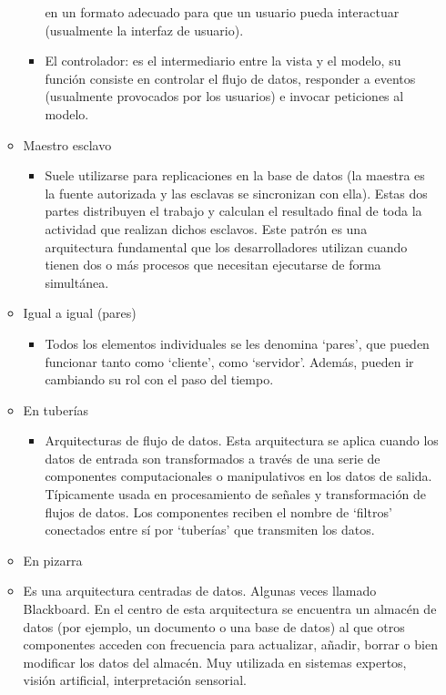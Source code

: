 \documentclass[12pt, twoside, openright]{report} %
\begin{document}
\begin{itemize}
\begin{itemize}
\begin{itemize}
						en un formato adecuado para que un usuario pueda interactuar
						(usualmente la interfaz de usuario).
						\item
						El controlador: es el intermediario entre la vista y el modelo,
						su función consiste en controlar el flujo de datos, responder a
						eventos (usualmente provocados por los usuarios) e invocar
						peticiones al modelo.
					\end{itemize}
			\item Maestro esclavo
				\begin{itemize}
					\item Suele utilizarse para replicaciones en la base de datos (la
					maestra es la fuente autorizada y las esclavas se sincronizan
					con ella). Estas dos partes distribuyen el trabajo y calculan el
					resultado final de toda la actividad que realizan dichos
					esclavos. Este patrón es una arquitectura fundamental que los
					desarrolladores utilizan cuando tienen dos o más procesos que
					necesitan ejecutarse de forma simultánea.
				\end{itemize}
			\item Igual a igual (pares)
				\begin{itemize}
					\item Todos los elementos individuales se les denomina `pares', que
					pueden funcionar tanto como `cliente', como `servidor'. Además,
					pueden ir cambiando su rol con el paso del tiempo.
				\end{itemize}
			\item En tuberías
				\begin{itemize}
					\item Arquitecturas de flujo de datos. Esta arquitectura se aplica
					cuando los datos de entrada son transformados a través de una
					serie de componentes computacionales o manipulativos en los
					datos de salida. Típicamente usada en procesamiento de señales y
					transformación de flujos de datos. Los componentes reciben el
					nombre de `filtros' conectados entre sí por `tuberías' que
					transmiten los datos.
				\end{itemize}
			\item En pizarra
			\item Es una arquitectura centradas de datos. Algunas veces llamado
				Blackboard. En el centro de esta arquitectura se encuentra un
				almacén de datos (por ejemplo, un documento o una base de datos)
				al que otros componentes acceden con frecuencia para actualizar,
				añadir, borrar o bien modificar los datos del almacén. Muy
				utilizada en sistemas expertos, visión artificial, interpretación
				sensorial.
		\end{itemize}
\end{itemize}
\end{document}
